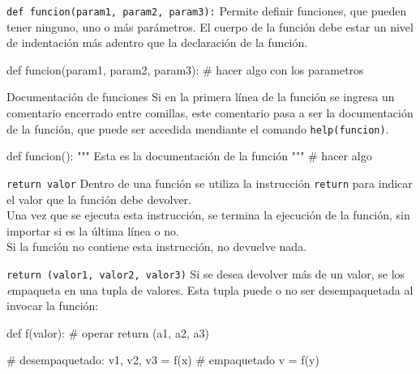 \begin{referencia_python}

\begin{sintaxis}{\lstinline!def funcion(param1, param2, param3):!}
Permite definir funciones, que pueden tener ninguno, uno o más
parámetros.  El cuerpo de la función debe estar un nivel de indentación
más adentro que la declaración de la función.

\begin{codigo-python-sn}
def funcion(param1, param2, param3):
    # hacer algo con los parametros
\end{codigo-python-sn}
\end{sintaxis}

\begin{sintaxis}{Documentación de funciones}
Si en la primera línea de la función se ingresa un comentario
encerrado entre comillas, este comentario pasa a ser la documentación
de la función, que puede ser accedida mendiante el comando
\lstinline!help(funcion)!.
\begin{codigo-python-sn}
def funcion():
	""" Esta es la documentación de la función """
	# hacer algo
\end{codigo-python-sn}
\end{sintaxis}

\begin{sintaxis}{\lstinline!return valor!}
Dentro de una función se utiliza la instrucción \lstinline!return!
para indicar el valor que la función debe devolver. \\

Una vez que se ejecuta esta instrucción, se termina la ejecución de la
función, sin importar si es la última línea o no. \\

Si la función no contiene esta instrucción, no devuelve nada.
\end{sintaxis}

\begin{sintaxis}{\lstinline!return (valor1, valor2, valor3)!}
Si se desea devolver más de un valor, se los {\textit empaqueta} en
una tupla de valores.  Esta tupla puede o no ser desempaquetada al
invocar la función:
\begin{codigo-python-sn}
def f(valor):
	# operar
	return (a1, a2, a3)

# desempaquetado:
v1, v2, v3 = f(x)
# empaquetado
v = f(y)
\end{codigo-python-sn}
\end{sintaxis}

\end{referencia_python}

